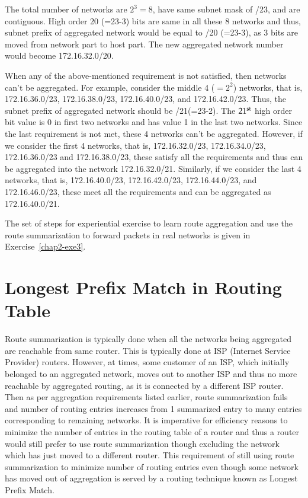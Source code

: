 \begin{multicols}{2}
The total number of networks are $2^{3}=8$, have same subnet mask of /23, and are contiguous. High order 20 (=23-3) bits are same in all these 8 networks and thus, subnet prefix of aggregated network would be equal to /20 (=23-3), as 3 bits are moved from network part to host part. The new aggregated network number would become 172.16.32.0/20.

When any of the above-mentioned requirement is not satisfied, then networks can’t be aggregated. For example, consider the middle 4 ($=2^{2}$) networks, that is, 172.16.36.0/23, 172.16.38.0/23, 172.16.40.0/23, and 172.16.42.0/23. Thus, the subnet prefix of aggregated network should be /21(=23-2). The $21^{\rm st}$ high order bit value is 0 in first two networks and has value 1 in the last two networks. Since the last requirement is not met, these 4 networks can’t be aggregated. However, if we consider the first 4 networks, that is, 172.16.32.0/23, 172.16.34.0/23, 172.16.36.0/23 and 172.16.38.0/23, these satisfy all the requirements and thus can be aggregated into the network 172.16.32.0/21. Similarly, if we consider the last 4 networks, that is, 172.16.40.0/23, 172.16.42.0/23, 172.16.44.0/23, and 172.16.46.0/23, these meet all the requirements and can be aggregated as 172.16.40.0/21.

The set of steps for experiential exercise to learn route aggregation and use the route summarization to forward packets in real networks is given in Exercise~\ref{chap2-exe3}.

\section{Longest Prefix Match in Routing Table}\label{chap2-sec6}

Route summarization is typically done when all the networks being aggregated are reachable from same router. This is typically done at ISP (Internet Service Provider) routers. However, at times, some customer of an ISP, which initially belonged to an aggregated network, moves out to another ISP and thus no more reachable by aggregated routing, as it is connected by a different ISP router. Then as per aggregation requirements listed earlier, route summarization fails and number of routing entries increases from 1 summarized entry to many entries corresponding to remaining networks. It is imperative for efficiency reasons to minimize the number of entries in the routing table of a router and thus a router would still prefer to use route summarization though excluding the network which has just moved to a different router. This requirement of still using route summarization to minimize number of routing entries even though some network has moved out of aggregation is served by a routing technique known as Longest Prefix Match.


\end{multicols}
